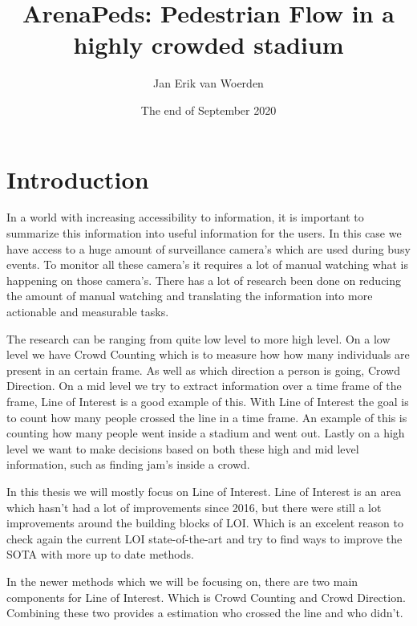 \documentclass{article}
\title{ArenaPeds: Pedestrian Flow in a highly crowded stadium}
\author{Jan Erik van Woerden}
\date{The end of September 2020}
\begin{document}
\maketitle

\section{Introduction}
In a world with increasing accessibility to information, it is important to summarize this information into useful information for the users.  In this case we have access to a huge amount of surveillance camera's which are used during busy events. To monitor all these camera's it requires a lot of manual watching what is happening on those camera's. There has a lot of research been done on reducing the amount of manual watching and translating the information into more actionable and measurable tasks.

The research can be ranging from quite low level to more high level. On a low level we have Crowd Counting which is to measure how how many individuals are present in an certain frame. As well as which direction a person is going, Crowd Direction. On a mid level we try to extract information over a time frame of the frame, Line of Interest is a good example of this. With Line of Interest the goal is to count how many people crossed the line in a time frame. An example of this is counting how many people went inside a stadium and went out. Lastly on a high level we want to make decisions based on both these high and mid level information, such as finding jam's inside a crowd.

In this thesis we will mostly focus on Line of Interest. Line of Interest is an area which hasn't had a lot of improvements since 2016, but there were still a lot improvements around the building blocks of LOI. Which is an excelent reason to check again the current LOI state-of-the-art and try to find ways to improve the SOTA with more up to date methods.

In the newer methods which we will be focusing on, there are two main components for Line of Interest. Which is Crowd Counting and Crowd Direction. Combining these two provides a estimation who crossed the line and who didn't.


\end{document}
